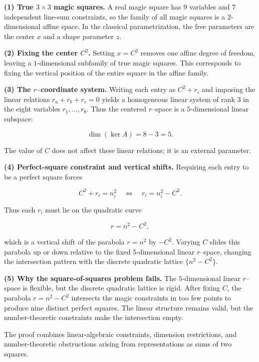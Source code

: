 \documentclass[12pt]{article}
\begin{document}
\begin{tcolorbox}[colback=gray!5,colframe=black,title=Summary of Dimensions and Degrees of Freedom]
\textbf{(1) True $3\times 3$ magic squares.}
A real magic square has $9$ variables and $7$ independent line-sum constraints,
so the family of all magic squares is a $2$-dimensional affine space.  In the
classical parametrization, the free parameters are the center $x$ and a shape
parameter $z$.

\medskip
\textbf{(2) Fixing the center $C^2$.}
Setting $x=C^2$ removes one affine degree of freedom, leaving a
$1$-dimensional subfamily of true magic squares.  This corresponds to fixing
the vertical position of the entire square in the affine family.

\medskip
\textbf{(3) The $r$--coordinate system.}
Writing each entry as $C^2+r_i$ and imposing the linear relations
$r_a+r_b+r_c=0$ yields a homogeneous linear system of rank $3$ in the eight
variables $r_1,\dots,r_8$.  Thus the centered $r$--space is a
$5$-dimensional linear subspace:


\[
\dim(\ker A)=8-3=5.
\]


The value of $C$ does not affect these linear relations; it is an external
parameter.

\medskip
\textbf{(4) Perfect-square constraint and vertical shifts.}
Requiring each entry to be a perfect square forces


\[
C^2+r_i = n_i^2
\quad\Longleftrightarrow\quad
r_i = n_i^2 - C^2.
\]


Thus each $r_i$ must lie on the quadratic curve


\[
r = n^2 - C^2,
\]


which is a vertical shift of the parabola $r=n^2$ by $-C^2$.  Varying $C$
slides this parabola up or down relative to the fixed $5$-dimensional linear
$r$--space, changing the intersection pattern with the discrete quadratic
lattice $\{n^2-C^2\}$.

\medskip
\textbf{(5) Why the square-of-squares problem fails.}
The $5$-dimensional linear $r$--space is flexible, but the discrete quadratic
lattice is rigid.  After fixing $C$, the parabola $r=n^2-C^2$ intersects the
magic constraints in too few points to produce nine distinct perfect squares.
The linear structure remains valid, but the number-theoretic constraints make
the intersection empty.
\end{tcolorbox}

The proof combines linear-algebraic constraints, dimension restrictions, and
number-theoretic obstructions arising from representations as sums of two
squares.
\end{document}
